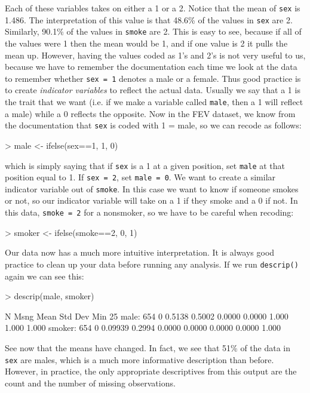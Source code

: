 \documentclass[landscape]{article}
\renewenvironment{Schunk}{\vspace{\topsep}}{\vspace{\topsep}}
\begin{document}
Each of these variables takes on either a 1 or a 2. Notice that the mean of \texttt{sex} is 1.486. The interpretation of this value is that 48.6\% of the values in \texttt{sex} are 2. Similarly, 90.1\% of the values in \texttt{smoke} are 2. This is easy to see, because if all of the values were 1 then the mean would be 1, and if one value is 2 it pulls the mean up. However, having the values coded as 1's and 2's is not very useful to us, because we have to remember the documentation each time we look at the data to remember whether \texttt{sex = 1} denotes a male or a female. Thus good practice is to create \emph{indicator variables} to reflect the actual data. Usually we say that a 1 is the trait that we want (i.e. if we make a variable called \texttt{male}, then a 1 will reflect a male) while a 0 reflects the opposite. Now in the FEV dataset, we know from the documentation that \texttt{sex} is coded with 1 = male, so we can recode as follows:
\begin{Schunk}
\begin{Sinput}
> male <- ifelse(sex==1, 1, 0)
\end{Sinput}
\end{Schunk}
which is simply saying that if \texttt{sex} is a 1 at a given position, set \texttt{male} at that position equal to 1. If \texttt{sex = 2}, set \texttt{male = 0}. We want to create a similar indicator variable out of \texttt{smoke}. In this case we want to know if someone smokes or not, so our indicator variable will take on a 1 if they smoke and a 0 if not. In this data, \texttt{smoke = 2} for a nonsmoker, so we have to be careful when recoding:
\begin{Schunk}
\begin{Sinput}
> smoker <- ifelse(smoke==2, 0, 1)
\end{Sinput}
\end{Schunk}
Our data now has a much more intuitive interpretation. It is always good practice to clean up your data before running any analysis. If we run \texttt{descrip()} again we can see this:
\begin{Schunk}
\begin{Sinput}
> descrip(male, smoker)
\end{Sinput}
\begin{Soutput}
          N     Msng  Mean      Std Dev    Min       25%
  male:     654     0   0.5138    0.5002    0.0000    0.0000    1.000     1.000     1.000  
smoker:     654     0  0.09939    0.2994    0.0000    0.0000    0.0000    0.0000    1.000  
\end{Soutput}
\end{Schunk}
See now that the means have changed. In fact, we see that 51\% of the data in \texttt{sex} are males, which is a much more informative description than before. However, in practice, the only appropriate descriptives from this output are the count and the number of missing observations.
\end{document}
